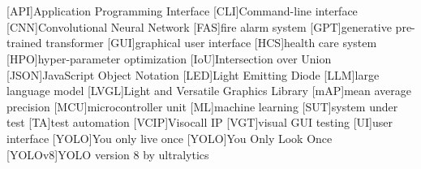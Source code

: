 \documentclass[Bachelor, BIC, english, fhCitStyle, IEEE]{BASE/twbook} %
\begin{document}
\chapter*{\listacroname}
\begin{acronym}
    [API]{Application Programming Interface}
    [CLI]{Command-line interface}
    [CNN]{Convolutional Neural Network}
    [FAS]{fire alarm system}
    [GPT]{generative pre-trained transformer}
    [GUI]{graphical user interface}
    [HCS]{health care system}
    [HPO]{hyper-parameter optimization}
    [IoU]{Intersection over Union}
    [JSON]{JavaScript Object Notation}
    [LED]{Light Emitting Diode}
    [LLM]{large language model}
    [LVGL]{Light and Versatile Graphics Library}
    [mAP]{mean average precision}
    [MCU]{microcontroller unit}
    [ML]{machine learning}
    [SUT]{system under test}
    [TA]{test automation}
    [VCIP]{Visocall IP}
    [VGT]{visual GUI testing}
    [UI]{user interface}
    [YOLO]{You only live once}
    [YOLO]{You Only Look Once}
    [YOLOv8]{YOLO version 8 by ultralytics}
\end{acronym}
\end{document}
